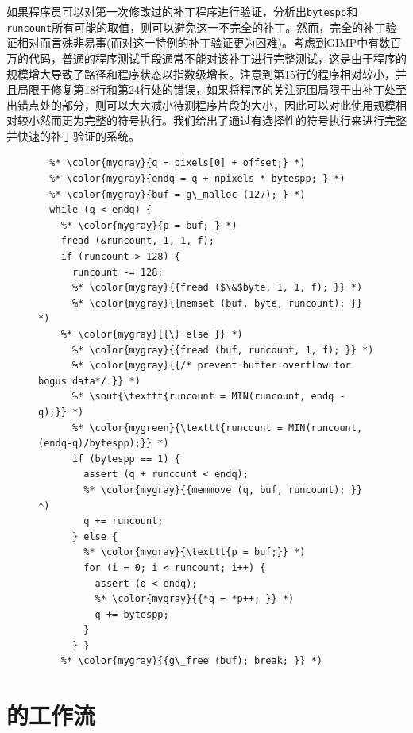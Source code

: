 如果程序员可以对第一次修改过的补丁程序进行验证，分析出\texttt{bytespp}和 \texttt{runcount}所有可能的取值，则可以避免这一不完全的补丁。然而，完全的补丁验证相对而言殊非易事(而对这一特例的补丁验证更为困难)。考虑到GIMP中有数百万的代码，普通的程序测试手段通常不能对该补丁进行完整测试，这是由于程序的规模增大导致了路径和程序状态以指数级增长。注意到第15行的程序相对较小，并且局限于修复第18行和第24行处的错误，如果将程序的关注范围局限于由补丁处至出错点处的部分，则可以大大减小待测程序片段的大小，因此可以对此使用规模相对较小然而更为完整的符号执行。我们给出了通过有选择性的符号执行来进行完整并快速的补丁验证的系统\dryrun 。

\begin{figure}[t]
\begin{center}
\begin{lstlisting}[language={[ANSI]C}]
%* \color{mygray}{case PSP\_COMP\_RLE: { } *)
  %* \color{mygray}{q = pixels[0] + offset;} *)
  %* \color{mygray}{endq = q + npixels * bytespp; } *)
  %* \color{mygray}{buf = g\_malloc (127); } *)
  while (q < endq) {
    %* \color{mygray}{p = buf; } *)
    fread (&runcount, 1, 1, f);
    if (runcount > 128) {
      runcount -= 128;
      %* \color{mygray}{{fread ($\&$byte, 1, 1, f); }} *)
      %* \color{mygray}{{memset (buf, byte, runcount); }} *)
    %* \color{mygray}{{\} else }} *)
      %* \color{mygray}{{fread (buf, runcount, 1, f); }} *)
      %* \color{mygray}{{/* prevent buffer overflow for bogus data*/ }} *)
      %* \sout{\texttt{runcount = MIN(runcount, endq - q);}} *)
      %* \color{mygreen}{\texttt{runcount = MIN(runcount, (endq-q)/bytespp);}} *)
      if (bytespp == 1) {
        assert (q + runcount < endq);
        %* \color{mygray}{{memmove (q, buf, runcount); }} *)
        q += runcount;
      } else {
        %* \color{mygray}{\texttt{p = buf;}} *)
        for (i = 0; i < runcount; i++) {
          assert (q < endq);
          %* \color{mygray}{{*q = *p++; }} *)
          q += bytespp;
        }
      } }
    %* \color{mygray}{{g\_free (buf); break; }} *)
\end{lstlisting}
\vspace{-0.5cm}
\end{center}
\end{figure}


\section{\dryrun 的工作流}
\label{sec:dryrun_workflow}

